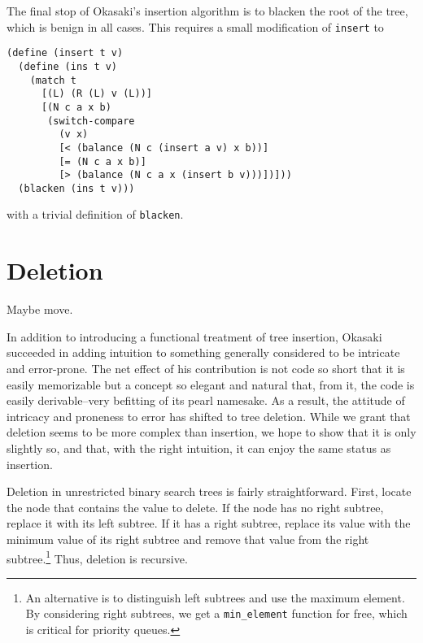 \documentclass[preprint]{sigplanconf}
\begin{document}
The final stop of Okasaki's insertion algorithm is to blacken the root of the tree, which is benign in all cases. This requires a small modification of \texttt{insert} to 
\begin{verbatim}
(define (insert t v)
  (define (ins t v)
    (match t
      [(L) (R (L) v (L))]
      [(N c a x b)
       (switch-compare
         (v x)
         [< (balance (N c (insert a v) x b))]
         [= (N c a x b)]
         [> (balance (N c a x (insert b v)))])]))
  (blacken (ins t v)))
\end{verbatim}
with a trivial definition of \texttt{blacken}.




\section{Deletion}

Maybe move.

In addition to introducing a functional treatment of tree insertion, Okasaki succeeded in adding intuition to something generally considered to be intricate and error-prone. The net effect of his contribution is not code so short that it is easily memorizable but a concept so elegant and natural that, from it, the code is easily derivable--very befitting of its pearl namesake. As a result, the attitude of intricacy and proneness to error has shifted to tree deletion. While we grant that deletion seems to be more complex than insertion, we hope to show that it is only slightly so, and that, with the right intuition, it can enjoy the same status as insertion.

Deletion in unrestricted binary search trees is fairly straightforward. First, locate the node that contains the value to delete. If the node has no right subtree, replace it with its left subtree. If it has a right subtree, replace its value with the minimum value of its right subtree and remove that value from the right subtree.\footnote{An alternative is to distinguish left subtrees and use the maximum element. By considering right subtrees, we get a \texttt{min\_element} function for free, which is critical for priority queues.} Thus, deletion is recursive.
\end{document}
